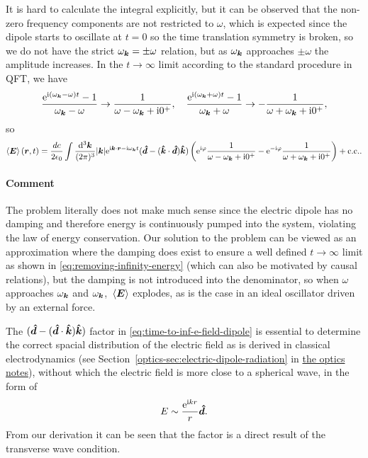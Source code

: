 \documentclass[hyperref, a4paper]{article}
\newcommand{\opticsdoc}{\href{../optics/optics}{the optics notes}}
\newcommand*{\ii}{\mathrm{i}}
\newcommand*{\ee}{\mathrm{e}}
\begin{document}
It is hard to calculate the integral explicitly, but it can be observed that the non-zero frequency components are not restricted to $\omega$, which is expected since the dipole starts to oscillate at $t=0$ so the time translation symmetry is broken, so we do not have the strict $\omega_{\vb*{k}} = \pm \omega$ relation, but as $\omega_{\vb*{k}}$ approaches $\pm \omega$ the amplitude increases.
In the $t \to \infty$ limit according to the standard procedure in QFT, we have 
\begin{equation}
    \frac{\ee^{\ii (\omega_{\vb*{k}} - \omega) t} - 1}{\omega_{\vb*{k}} - \omega}  \to \frac{1}{\omega - \omega_{\vb*{k}} + \ii 0^+}, \quad \frac{\ee^{\ii (\omega_{\vb*{k}} + \omega) t} - 1}{\omega_{\vb*{k}} + \omega} \to - \frac{1}{\omega + \omega_{\vb*{k}} + \ii 0^+},
    \label{eq:removing-infinity-energy}
\end{equation}
so 
\begin{equation}
    \expval{\vb*{E}}(\vb*{r}, t) = \frac{d c}{2 \epsilon_0 } \int \frac{\dd[3]{\vb*{k}}}{(2\pi)^3} \abs{\vb*{k}} \ee^{\ii \vb*{k} \cdot \vb*{r} - \ii \omega_{\vb*{k}} t} (\vu*{d} - (\vu*{k} \cdot \vu*{d}) \vu*{k}) \left( \ee^{\ii \varphi} \frac{1}{\omega - \omega_{\vb*{k}} + \ii 0^+} - \ee^{- \ii \varphi} \frac{1}{\omega + \omega_{\vb*{k}} + \ii 0^+} \right) + \text{c.c.}.
    \label{eq:time-to-inf-e-field-dipole}
\end{equation}

\paragraph{Comment} The problem literally does not make much sense since the electric dipole has no damping and therefore energy is continuously pumped into the system, violating the law of energy conservation.
Our solution to the problem can be viewed as an approximation where the damping does exist to ensure a well defined $t \to \infty$ limit as shown in \eqref{eq:removing-infinity-energy} (which can also be motivated by causal relations), but the damping is not introduced into the denominator, so when $\omega$ approaches $\omega_{\vb*{k}}$ and $\omega_{\vb*{k}}$, $\expval*{\vb*{E}}$ explodes, as is the case in an ideal oscillator driven by an external force.

The $(\vu*{d} - (\vu*{d} \cdot \vu*{k}) \vu*{k})$ factor in \eqref{eq:time-to-inf-e-field-dipole} is essential to determine the correct spacial distribution of the electric field as is derived in classical electrodynamics (see Section~\ref{optics-sec:electric-dipole-radiation} in \opticsdoc), without which the electric field is more close to a spherical wave, in the form of 
\[
    E \sim \frac{\ee^{\ii k r}}{r} \vu*{d}.
\]
From our derivation it can be seen that the factor is a direct result of the transverse wave condition.
\end{document}

